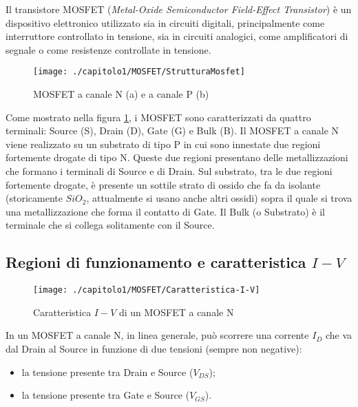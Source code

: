 Il transistore MOSFET (\emph{Metal-Oxide Semiconductor Field-Effect Transistor}) è un dispositivo elettronico utilizzato sia in circuiti digitali, principalmente come interruttore controllato in tensione, sia in circuiti analogici, come amplificatori di segnale o come resistenze controllate in tensione.\\

\begin{figure}[H]
  \centering
  \texttt{[image: ./capitolo1/MOSFET/StrutturaMosfet]}
  \caption[Struttura dei MOSFET]{MOSFET a canale N (a) e a canale P (b) \cite{transistore_MOSFET:From_MOSFET_to_FinFET_to_GAAFET}}
  \label{fig:StrutturaMosfet}
\end{figure}

Come mostrato nella figura \ref{fig:StrutturaMosfet}, i MOSFET sono caratterizzati da quattro terminali: Source (S), Drain (D), Gate (G) e Bulk (B).
Il MOSFET a canale N viene realizzato su un substrato di tipo P in cui sono innestate due regioni fortemente drogate di tipo N. Queste due regioni presentano delle metallizzazioni che formano i terminali di Source e di Drain. Sul substrato, tra le due regioni fortemente drogate, è presente un sottile strato di ossido che fa da isolante (storicamente $SiO_2$, attualmente si usano anche altri ossidi) sopra il quale si trova una metallizzazione che forma il contatto di Gate. Il Bulk (o Substrato) è il terminale che si collega solitamente con il Source.\\

\subsection{Regioni di funzionamento e caratteristica $I-V$}

\begin{figure}[H]
  \centering
  \texttt{[image: ./capitolo1/MOSFET/Caratteristica-I-V]}
  \caption[Caratteristica $I-V$ di un MOSFET a canale N]{Caratteristica $I-V$ di un MOSFET a canale N}
  \label{fig:caratteristica-I-V}
\end{figure}

In un MOSFET a canale N, in linea generale, può scorrere una corrente $I_D$ che va dal Drain al Source in funzione di due tensioni (sempre non negative): 
\begin{itemize}
  \item la tensione presente tra Drain e Source ($V_{DS}$);
  \item la tensione presente tra Gate e Source ($V_{GS}$).  
\end{itemize}

